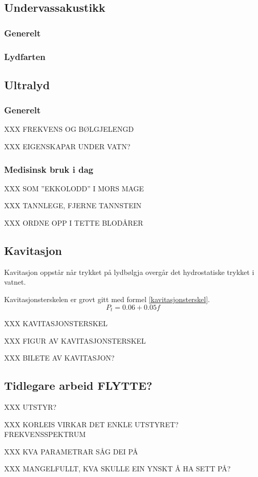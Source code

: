 \subsection{Undervassakustikk}
\subsubsection*{Generelt}

\subsubsection*{Lydfarten}

\subsection{Ultralyd}
\subsubsection*{Generelt}
XXX FREKVENS OG BØLGJELENGD

XXX EIGENSKAPAR UNDER VATN?

\subsubsection*{Medisinsk bruk i dag}
XXX SOM ''EKKOLODD'' I MORS MAGE

XXX TANNLEGE, FJERNE TANNSTEIN

XXX ORDNE OPP I TETTE BLODÅRER

\subsection{Kavitasjon}
Kavitasjon oppstår når trykket på lydbølgja overgår det hydrostatiske trykket i vatnet.\cite{Kinsler:2000rc}

Kavitasjonsterskelen er grovt gitt\cite{kavitasjon} med formel \eqref{kavitasjonsterskel}. 
\begin{equation}
\label{kavitasjonsterskel}
P_t = 0.06 + 0.05f
\end{equation}

XXX KAVITASJONSTERSKEL

XXX FIGUR AV KAVITASJONSTERSKEL

XXX BILETE AV KAVITASJON?

\subsection{Tidlegare arbeid FLYTTE?}
XXX UTSTYR?

XXX KORLEIS VIRKAR DET ENKLE UTSTYRET? FREKVENSSPEKTRUM

XXX KVA PARAMETRAR SÅG DEI PÅ

XXX MANGELFULLT, KVA SKULLE EIN YNSKT Å HA SETT PÅ?
